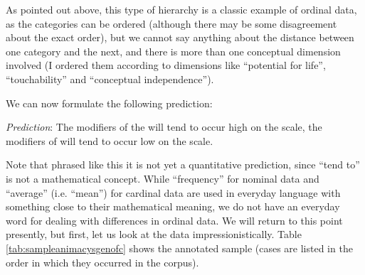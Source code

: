 As pointed out above, this type of  hierarchy is a classic example of ordinal data, as the categories can be ordered (although there may be some disagreement about the exact order), but we cannot say anything about the distance between one category and the next, and there is more than one conceptual dimension involved (I ordered them according to dimensions like ``potential for life'', ``touchability'' and ``conceptual independence'').

We can now formulate the following prediction:

\begin{exe}
\ex \emph{Prediction}: The modifiers of the  will tend to occur high on the  scale, the modifiers of  will tend to occur low on the  scale.
\label{ex:animacyprediction}
\end{exe}

Note that phrased like this it is not yet a quantitative prediction, since ``tend to'' is not a mathematical concept. While ``frequency'' for nominal data and ``average'' (i.e. ``mean'') for cardinal data are used in everyday language with something close to their mathematical meaning, we do not have an everyday word for dealing with differences in ordinal data. We will return to this point presently, but first, let us look at the data impressionistically. Table \ref{tab:sampleanimacysgenofc} shows the annotated sample (cases are listed in the order in which they occurred in the corpus).

